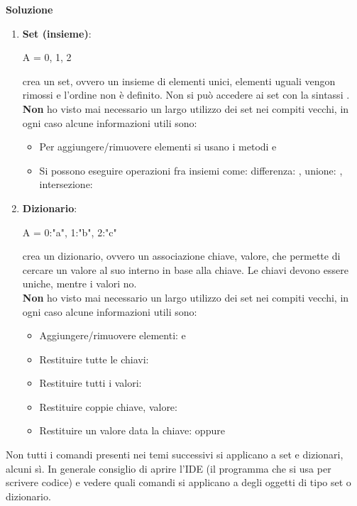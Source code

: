 \documentclass[10pt]{extarticle}
\makeatletter
\newcommand{\<}{\langle}
\renewcommand{\>}{\rangle}
\renewenvironment{proof}[1][\proofname] {\par\pushQED{\qed}
\renewcommand*{\proofname}{Soluzione}
{\normalfont\sffamily\bfseries\topsep6\p@\@plus6\p@\relax #1\@addpunct{.} }}{\popQED\endtrivlist\@endpefalse}
\theoremstyle{mystyle}{\newtheorem*{remark}{Nota}}
\theoremstyle{mystyle}{\newtheorem*{remarks}{Note}}
\theoremstyle{mystyle}{\newtheorem*{example}{Esempio}}
\theoremstyle{mystyle}{\newtheorem*{examples}{Esempi}}
\theoremstyle{definition}{\newtheorem*{exercise}{Exercise}}
\theoremstyle{warn}
\makeatother
\begin{document}
\begin{proof}
\begin{enumerate}
    \item \textbf{Set (insieme)}:
    \begin{python}
A = {0, 1, 2}
    \end{python}
    crea un set, ovvero un insieme di elementi unici, elementi uguali vengon rimossi e l'ordine non è definito. Non si può accedere ai set con la sintassi .\\
    \textbf{Non} ho visto mai necessario un largo utilizzo dei set nei compiti vecchi, in ogni caso alcune informazioni utili sono:
    \begin{itemize}
        \item Per aggiungere/rimuovere elementi si usano i metodi  e 
        \item Si possono eseguire operazioni fra insiemi come: differenza: , unione: , intersezione: 
    \end{itemize}
    \item \textbf{Dizionario}:
    \begin{python}
A = {0:"a", 1:"b", 2:"c"}
    \end{python}
    crea un dizionario, ovvero un associazione chiave, valore, che permette di cercare un valore al suo interno in base alla chiave. Le chiavi devono essere uniche, mentre i valori no.\\
    \textbf{Non} ho visto mai necessario un largo utilizzo dei set nei compiti vecchi, in ogni caso alcune informazioni utili sono:
    \begin{itemize}
    \item Aggiungere/rimuovere elementi:  e 
    \item Restituire tutte le chiavi: 
    \item Restituire tutti i valori: 
    \item Restituire coppie chiave, valore: 
    \item Restituire un valore data la chiave:  oppure 
    \end{itemize}
\end{enumerate}
\end{proof}
\begin{remark}
Non tutti i comandi presenti nei temi successivi si applicano a set e dizionari, alcuni sì. In generale consiglio di aprire l'IDE (il programma che si usa per scrivere codice) e vedere quali comandi si applicano a degli oggetti di tipo set o dizionario.
\end{remark}
\end{document}
